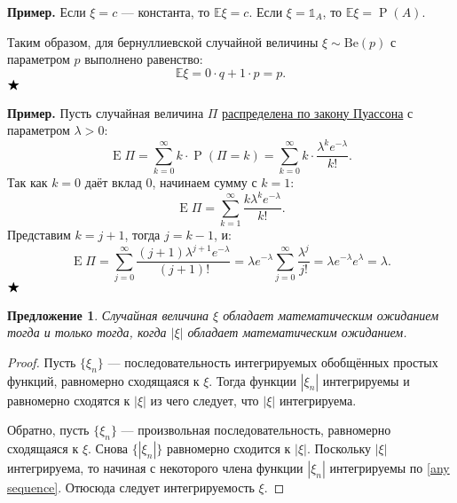 \documentclass[12pt]{article}
\newtheorem{proposition}[theorem]{Предложение}
\numberwithin{theorem}{section}
\theoremstyle{definition}
\newenvironment{example}{\indent \textbf{Пример.}}{$ \hfill \bigstar $}
\newcommand{\prob}{\operatorname{P}}
\newcommand{\expect}{\operatorname{E}}
\newcommand{\ind}{\mathds{1}}
\begin{document}
	\begin{example}
		Если $\xi = c$ --- константа, то $\mathbb{E}\xi = c$.  
		Если $\xi = \ind_A$, то $\mathbb{E}\xi = \prob(A)$.  
		
		Таким образом, для бернуллиевской случайной величины $ \xi \sim \mathrm{Be}(p) $ с параметром $ p $ выполнено равенство:
		$$ \mathbb{E}\xi = 0 \cdot q + 1 \cdot p = p. $$
	\end{example}
	
	\begin{example}
		Пусть случайная величина $\Pi$ \hyperlink{Poisson-distribution}{распределена по закону Пуассона} с параметром $\lambda > 0$:
		\[
		\expect\Pi = \sum_{k=0}^{\infty} k \cdot \prob(\Pi = k) = \sum_{k=0}^{\infty} k \cdot \frac{\lambda^k e^{-\lambda}}{k!}.
		\]
		Так как $k = 0$ даёт вклад 0, начинаем сумму с $k = 1$:
		\[
		\expect\Pi = \sum_{k=1}^{\infty} \frac{k \lambda^k e^{-\lambda}}{k!}.
		\]
		Представим $k = j + 1$, тогда $j = k - 1$, и:
		\[
		\expect\Pi = \sum_{j=0}^{\infty} \frac{(j+1) \lambda^{j+1} e^{-\lambda}}{(j+1)!} = 
		\lambda e^{-\lambda} \sum_{j=0}^{\infty} \frac{\lambda^j}{j!} = 
		\lambda e^{-\lambda} e^{\lambda} = \lambda.
		\]
	\end{example}
	
	\begin{proposition}
		Случайная величина $ \xi $ обладает математическим ожиданием тогда и только тогда, 
		когда $ |\xi| $ обладает математическим ожиданием.
	\end{proposition}
	
	\begin{proof}
		Пусть $ \{\xi_n\} $ --- последовательность интегрируемых обобщённых простых функций, равномерно сходящаяся к $ \xi $.
		Тогда функции $ |\xi_n| $ интегрируемы и равномерно сходятся к $ |\xi| $ из чего следует, что $ |\xi| $ интегрируема.
		
		Обратно, пусть $ \{\xi_n\} $ --- произвольная последовательность, равномерно сходящаяся к $ \xi $.
		Снова $ \{|\xi_n|\} $ равномерно сходится к $ |\xi| $. Поскольку $ |\xi| $ интегрируема,
		то начиная с некоторого члена функции $ |\xi_n| $ интегрируемы по \ref{any sequence}. Отюсюда следует интегрируемость
		$ \xi $.
	\end{proof}
	
\end{document}
